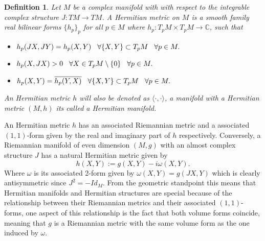 \documentclass[12pt,twoside,a4paper]{report}
\newtheorem{definition}{Definition}[section]
\newcommand{\co}{\ensuremath{\mathbb C }}
\begin{document}
\begin{definition}
        Let $M$ be a complex manifold with with respect to the integrable complex structure $J:TM\rightarrow TM$. A \textit{Hermitian metric} on $M$ is a smooth family real bilinear forms $\lbrace h_p\rbrace_p$ for all $p\in M$ where $h_p:T_pM\times T_pM\rightarrow\co$, such that
\begin{itemize}
        \item $h_p(JX,JY)=h_p(X,Y)\hspace{0.3cm}\forall\lbrace X,Y\rbrace\subset T_pM\hspace{0.3cm}\forall p\in M.$
        \item $h_p(X,JX)>0\hspace{0.3cm}\forall X\in T_p M\setminus\lbrace 0\rbrace\hspace{0.3cm}\forall p\in M.$
        \item $h_p(X,Y)=\overline{h_p(Y,X)}\hspace{0.3cm}\forall\lbrace X,Y\rbrace\subset T_pM\hspace{0.3cm}\forall p\in M.$
\end{itemize}
An Hermitian metric $h$ will also be denoted as $\langle\cdot,\cdot\rangle$, a manifold with a Hermitian metric $(M,h)$ its called a \textit{Hermitian manifold}.
\end{definition}
An Hermitian metric $h$ has an associated Riemannian metric and a associated $(1,1)$-form given by the real and
imaginary part of $h$ respectively. Conversely, a Riemannian manifold of even dimension $(M,g)$ with an almost complex structure $J$ has
a natural Hermitian metric given by
\[
  h(X,Y):=g(X,Y)-i\omega(X,Y).
\]
\noindent Where $\omega$ is its associated 2-form given by $\omega(X,Y)=g(JX,Y)$ which is clearly antisymmetric since $J^2=-Id_M$. From the geometric standpoint this means that Hermitian manifolds and Hermitian structures are special because of the relationship between their Riemannian metrics and their associated $(1,1)$-forms, one aspect of this relationship is the fact that both volume forms coincide, meaning that $g$ is a Riemannian metric with the same volume form as the one induced by $\omega$.
\end{document}
